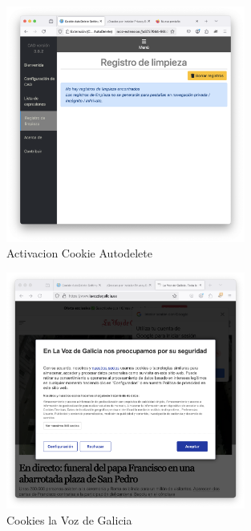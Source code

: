 \begin{figure}[H]   
    \centering
    \includegraphics[width=0.7\textwidth]{activacion_cookie_autodelete.png}
    \caption{Activacion Cookie Autodelete}
    \label{fig:activacion_cookie_autodelete}
\end{figure}
\begin{figure}[H]   
    \centering
    \includegraphics[width=0.7\textwidth]{cookies_lavoz.png}
    \caption{Cookies la Voz de Galicia}
    \label{fig:cookies_lavoz}
\end{figure}


